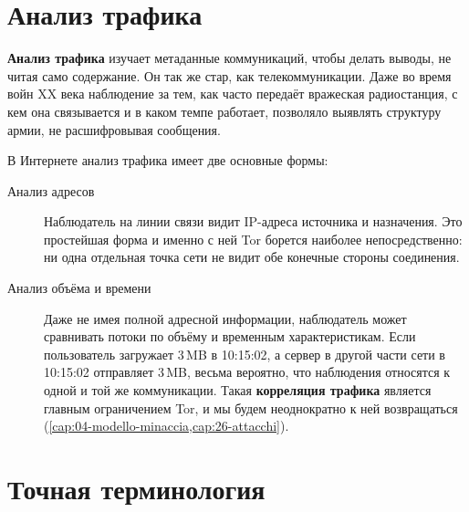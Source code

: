\section{Анализ трафика}\label{sec:anon-traffico}

\textbf{Анализ трафика} изучает метаданные коммуникаций, чтобы делать выводы, не читая само содержание. Он так же стар, как телекоммуникации. Даже во время войн XX века наблюдение за тем, как часто передаёт вражеская радиостанция, с кем она связывается и в каком темпе работает, позволяло выявлять структуру армии, не расшифровывая сообщения.

В Интернете анализ трафика имеет две основные формы:
\begin{description}
  \item[Анализ адресов] Наблюдатель на линии связи видит IP-адреса источника и назначения. Это простейшая форма и именно с ней Tor борется наиболее непосредственно: ни одна отдельная точка сети не видит обе конечные стороны соединения.
  \item[Анализ объёма и времени] Даже не имея полной адресной информации, наблюдатель может сравнивать потоки по объёму и временным характеристикам. Если пользователь загружает 3\,MB в 10:15:02, а сервер в другой части сети в 10:15:02 отправляет 3\,MB, весьма вероятно, что наблюдения относятся к одной и той же коммуникации. Такая \textbf{корреляция трафика} является главным ограничением Tor, и мы будем неоднократно к ней возвращаться (\cref{cap:04-modello-minaccia,cap:26-attacchi}).
\end{description}

\section{Точная терминология}\label{sec:anon-termini}

